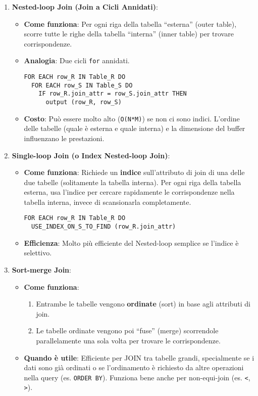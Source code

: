 \begin{enumerate}
    \item \textbf{Nested-loop Join (Join a Cicli Annidati)}:
    \begin{itemize}
        \item \textbf{Come funziona}: Per ogni riga della tabella ``esterna'' (outer table), scorre tutte le righe della tabella ``interna'' (inner table) per trovare corrispondenze.
        \item \textbf{Analogia}: Due cicli \texttt{for} annidati.
        \begin{verbatim}
FOR EACH row_R IN Table_R DO
  FOR EACH row_S IN Table_S DO
    IF row_R.join_attr = row_S.join_attr THEN
      output (row_R, row_S)
        \end{verbatim}
        \item \textbf{Costo}: Può essere molto alto (\texttt{O(N*M)}) se non ci sono indici. L'ordine delle tabelle (quale è esterna e quale interna) e la dimensione del buffer influenzano le prestazioni.
    \end{itemize}

    \item \textbf{Single-loop Join (o Index Nested-loop Join)}:
    \begin{itemize}
        \item \textbf{Come funziona}: Richiede un \textbf{indice} sull'attributo di join di una delle due tabelle (solitamente la tabella interna). Per ogni riga della tabella esterna, usa l'indice per cercare rapidamente le corrispondenze nella tabella interna, invece di scansionarla completamente.
        \begin{verbatim}
FOR EACH row_R IN Table_R DO
  USE_INDEX_ON_S_TO_FIND (row_R.join_attr)
        \end{verbatim}
        \item \textbf{Efficienza}: Molto più efficiente del Nested-loop semplice se l'indice è selettivo.
    \end{itemize}

    \item \textbf{Sort-merge Join}:
    \begin{itemize}
        \item \textbf{Come funziona}:
        \begin{enumerate}
            \item Entrambe le tabelle vengono \textbf{ordinate} (sort) in base agli attributi di join.
            \item Le tabelle ordinate vengono poi ``fuse'' (merge) scorrendole parallelamente una sola volta per trovare le corrispondenze.
        \end{enumerate}
        \item \textbf{Quando è utile}: Efficiente per JOIN tra tabelle grandi, specialmente se i dati sono già ordinati o se l'ordinamento è richiesto da altre operazioni nella query (es. \texttt{ORDER BY}). Funziona bene anche per non-equi-join (es. \texttt{<}, \texttt{>}).
    \end{itemize}


\end{enumerate}
